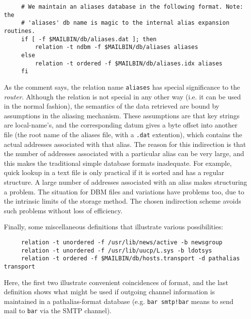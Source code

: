 \begin{tscreen}
\begin{verbatim}
     # We maintain an aliases database in the following format. Note: the
     # 'aliases' db name is magic to the internal alias expansion routines.
     if [ -f $MAILBIN/db/aliases.dat ]; then
         relation -t ndbm -f $MAILBIN/db/aliases aliases
     else
         relation -t ordered -f $MAILBIN/db/aliases.idx aliases
     fi
\end{verbatim}
\end{tscreen}


As the comment says, the relation name {\tt aliases} has special significance
to the {\em router\/}.  Although the relation is not special in any other way (i.e.
it can be used in the normal fashion), the semantics of the data retrieved
are bound by assumptions in the aliasing mechanism.  These assumptions are
that key strings are local-name's, and the corresponding datum gives a byte
offset into another file (the root name of the aliases file, with a {\tt .dat}
extention), which contains the actual addresses associated with that alias.
The reason for this indirection is that the number of addresses associated
with a particular alias can be very large, and this makes the traditional
simple database formats inadequate.  For example, quick lookup in a text
file is only practical if it is sorted and has a regular structure.  A
large number of addresses associated with an alias makes structuring a
problem.  The situation for DBM files and variations have problems too, due
to the intrinsic limits of the storage method.  The chosen indirection
scheme avoids such problems without loss of efficiency.

Finally, some miscellaneous definitions that illustrate various
possibilities:

\begin{tscreen}
\begin{verbatim}
     relation -t unordered -f /usr/lib/news/active -b newsgroup
     relation -t unordered -f /usr/lib/uucp/L.sys -b ldotsys
     relation -t ordered -f $MAILBIN/db/hosts.transport -d pathalias transport
\end{verbatim}
\end{tscreen}


Here, the first two illustrate convenient coincidences of format, and the
last definition shows what might be used if outgoing channel information is
maintained in a pathalias-format database (e.g. {\tt bar smtp!bar} means to
send mail to {\tt bar} via the SMTP channel).






